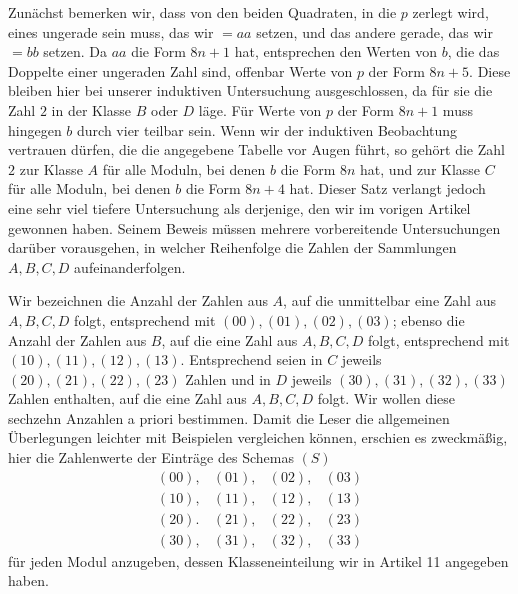 %
Zunächst bemerken wir, dass von den beiden Quadraten, in die $p$ zerlegt wird, eines ungerade sein muss, das wir $=aa$ setzen, und das andere gerade, das wir $=bb$ setzen. Da $aa$ die Form $8n+1$ hat, entsprechen den Werten von $b$, die das Doppelte einer ungeraden Zahl sind, offenbar Werte von $p$ der Form $8n+5$. Diese bleiben hier bei unserer induktiven Untersuchung ausgeschlossen, da für sie die Zahl $2$ in der Klasse $B$ oder $D$ läge. Für Werte von $p$ der Form $8n+1$ muss hingegen $b$ durch vier teilbar sein. Wenn wir der induktiven Beobachtung vertrauen dürfen, die die angegebene Tabelle vor Augen führt, so gehört die Zahl $2$ zur Klasse $A$ für alle Moduln, bei denen $b$ die Form $8n$ hat, und zur Klasse $C$ für alle Moduln, bei denen $b$ die Form $8n+4$ hat. Dieser Satz verlangt jedoch eine sehr viel tiefere Untersuchung als derjenige, den wir im vorigen Artikel gewonnen haben. Seinem Beweis müssen mehrere vorbereitende Untersuchungen darüber vorausgehen, in welcher Reihenfolge die Zahlen der Sammlungen $A,B,C,D$ aufeinanderfolgen.

Wir bezeichnen die Anzahl der Zahlen aus $A$, auf die unmittelbar eine Zahl aus $A,B,C,D$ folgt, entsprechend mit $(00),(01),(02),(03)$; ebenso die Anzahl der Zahlen aus $B$, auf die eine Zahl aus $A,B,C,D$ folgt, entsprechend mit $(10),(11),(12),(13)$. Entsprechend seien in $C$ jeweils $(20),(21),(22),(23)$ Zahlen und in $D$ jeweils $(30),(31),(32),(33)$ Zahlen enthalten, auf die eine Zahl aus $A,B,C,D$ folgt. Wir wollen diese sechzehn Anzahlen a priori bestimmen. Damit die Leser die allgemeinen Überlegungen leichter mit Beispielen vergleichen können, erschien es zweckmäßig, hier die Zahlenwerte der Einträge des Schemas $(S)$
\[
\begin{array}{llll}
(00),&(01),&(02),&(03)\\
(10),&(11),&(12),&(13)\\
(20).&(21),&(22),&(23)\\
(30),&(31),&(32),&(33)
\end{array}
\]
für jeden Modul anzugeben, dessen Klasseneinteilung wir in Artikel 11 angegeben haben.


